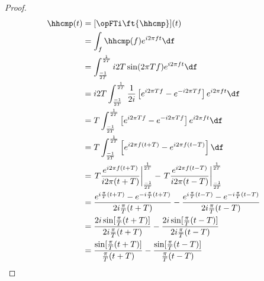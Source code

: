 \begin{proof}
\begin{align*}
   \hhcmp(t)
     &= [\opFTi\ft{\hhcmp}](t)
   \\&= \int_f \hhcmp(f) e^{i2\pi ft} \df
   \\&= \int_\frac{-1}{2T}^\frac{1}{2T}
        i2T \sin(2\pi Tf) e^{i2\pi ft} \df
   \\&= i2T\int_\frac{-1}{2T}^\frac{1}{2T}
        \frac{1}{2i}\left[ e^{i2\pi Tf} - e^{-i2\pi Tf}  \right]
        e^{i2\pi ft} \df
   \\&= T\int_\frac{-1}{2T}^\frac{1}{2T}
        \left[ e^{i2\pi Tf} - e^{-i2\pi Tf}  \right]
        e^{i2\pi ft} \df
   \\&= T\int_\frac{-1}{2T}^\frac{1}{2T}
        \left[ e^{i2\pi f(t+T)} - e^{i2\pi f(t-T)}  \right]
        \df
   \\&= \left. T\frac{e^{i2\pi f(t+T)}}{i2\pi (t+T)} \right|_\frac{-1}{2T}^\frac{1}{2T}  -
        \left. T\frac{e^{i2\pi f(t-T)}}{i2\pi (t-T)} \right|_\frac{-1}{2T}^\frac{1}{2T}
   \\&= \frac{e^{i\frac{\pi}{T} (t+T)} - e^{-i\frac{\pi}{T} (t+T)}}{2i\frac{\pi}{T} (t+T)}   -
        \frac{e^{i\frac{\pi}{T} (t-T)} - e^{-i\frac{\pi}{T} (t-T)}}{2i\frac{\pi}{T} (t-T)}
   \\&= \frac{2i\sin[\frac{\pi}{T}(t+T)]} {2i\frac{\pi}{T} (t+T)}   -
        \frac{2i\sin[\frac{\pi}{T}(t-T)]} {2i\frac{\pi}{T} (t-T)}
   \\&= \frac{\sin[\frac{\pi}{T}(t+T)]} {\frac{\pi}{T} (t+T)}   -
        \frac{\sin[\frac{\pi}{T}(t-T)]} {\frac{\pi}{T} (t-T)}
\end{align*}
\end{proof}
